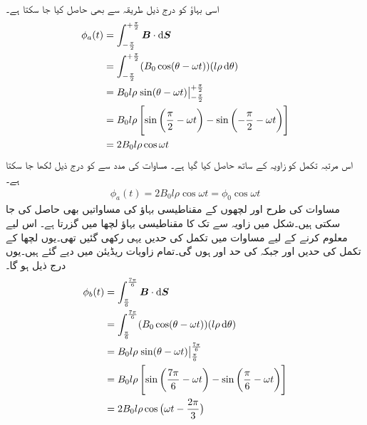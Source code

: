 اسی بہاؤ کو درج ذیل طریقہ سے بھی حاصل کیا جا سکتا ہے۔
\begin{gather}
\begin{aligned}\label{مساوات_گھومتے_مشین_قطبی_بہاو_بالمقابل_وقت}
\phi_a(t)&=\int_{-\frac{\pi}{2}}^{+\frac{\pi}{2}} \kvec{B} \cdot \dif \kvec{S}\\
&=\int_{-\frac{\pi}{2}}^{+\frac{\pi}{2}} (B_0 \cos (\theta-\omega t))(l \rho \dif \theta)\\
&=B_0 l \rho \left. \sin (\theta-\omega t) \right\vert_{-\frac{\pi}{2}}^{+\frac{\pi}{2}}\\
&=B_0 l \rho \left[\sin \left(\frac{\pi}{2}-\omega t \right )-\sin \left (-\frac{\pi}{2}-\omega t \right) \right]\\
&=2 B_0 l \rho \cos \omega t
\end{aligned}
\end{gather}
اس مرتبہ تکمل کو زاویہ  کے ساتھ حاصل کیا گیا ہے۔ مساوات   کی مدد سے   کو درج ذیل لکھا جا سکتا ہے۔
\begin{align}
\phi_a(t)=2 B_0 l \rho \cos \omega t=\phi_0 \cos \omega t
\end{align}
مساوات   کی طرح    اور  لچھوں کے  مقناطیسی بہاؤ کی مساواتیں بھی حاصل کی جا سکتی ہیں۔شکل   میں زاویہ  سے   تک کا مقناطیسی بہاؤ لچھا   میں  گزرتا ہے۔ اس لیے   معلوم کرنے کے لیے مساوات   میں تکمل کی حدیں یہی رکھی گئیں تھی۔یوں لچھا   کے تکمل کی حدیں    اور  جبکہ  کی حد  اور  ہوں گی۔تمام زاویات ریڈیئن میں دیے گئے ہیں۔یوں درج ذیل ہو گا۔
\begin{gather}
\begin{aligned}
\phi_b(t)&=\int_{\frac{\pi}{6}}^{\frac{7\pi}{6}} \kvec{B} \cdot \dif \kvec{S}\\
&=\int_{\frac{\pi}{6}}^{\frac{7\pi}{6}} (B_0 \cos (\theta-\omega t))(l \rho \dif \theta)\\
&=B_0 l \rho \left. \sin (\theta-\omega t) \right\vert_{\frac{\pi}{6}}^{\frac{7\pi}{6}}\\
&=B_0 l \rho \left[\sin \left(\frac{7\pi}{6}-\omega t \right )-\sin \left (\frac{\pi}{6}-\omega t \right) \right]\\
&=2 B_0 l \rho \cos \big(\omega t-\frac{2\pi}{3}\big)
\end{aligned}
\end{gather}
